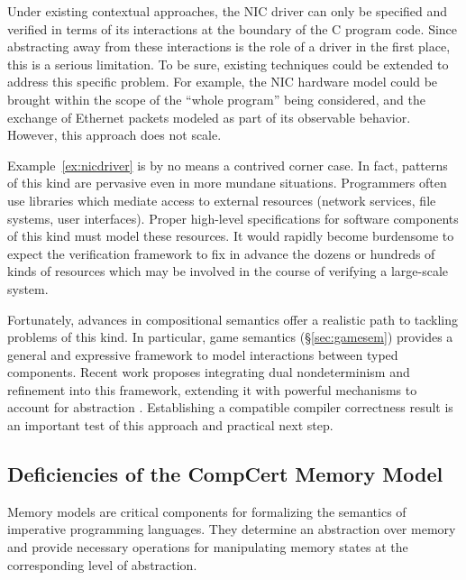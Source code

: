 Under existing contextual approaches, the NIC driver can only be
specified and verified in terms of its interactions at the boundary of
the C program code.  Since abstracting away from these interactions is
the role of a driver in the first place, this is a serious limitation.
To be sure, existing techniques could be extended to address this
specific problem.  For example, the NIC hardware model could be
brought within the scope of the ``whole program'' being considered,
and the exchange of Ethernet packets modeled as part of its observable
behavior.  However, this approach does not scale.

Example~\ref{ex:nicdriver} is by no means a contrived corner case. In
fact, patterns of this kind are pervasive even in more mundane
situations.  Programmers often use libraries which mediate access to
external resources (network services, file systems, user interfaces).
Proper high-level specifications for software components of this kind
must model these resources.  It would rapidly become burdensome to
expect the verification framework to fix in advance the dozens or
hundreds of kinds of resources which may be involved in the course of
verifying a large-scale system.

Fortunately, advances in compositional semantics offer a realistic
path to tackling problems of this kind.  In particular, game semantics
(\S\ref{sec:gamesem}) provides a general and expressive framework to
model interactions between typed components.  Recent work proposes
integrating dual nondeterminism and refinement into this framework,
extending it with powerful mechanisms to account for abstraction
\cite{rbgs-cal,layered22}.  Establishing a compatible compiler
correctness result is an important test of this approach and practical
next step.

\subsection{Deficiencies of the CompCert Memory Model}
\label{ssec:intro-nmm}

Memory models are critical components for formalizing the semantics of
imperative programming languages. They determine an abstraction over
memory and provide necessary operations for manipulating memory states
at the corresponding level of abstraction.

